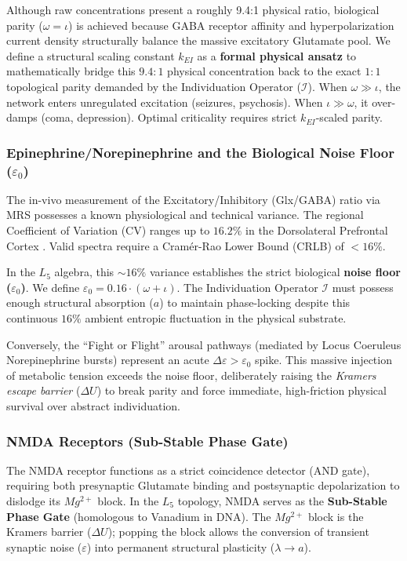 Although raw concentrations present a roughly 9.4:1 physical ratio, biological parity ($\omega = \iota$) is achieved because GABA receptor affinity and hyperpolarization current density structurally balance the massive excitatory Glutamate pool. We define a structural scaling constant $k_{EI}$ as a \textbf{formal physical ansatz} to mathematically bridge this $9.4:1$ physical concentration back to the exact $1:1$ topological parity demanded by the Individuation Operator ($\mathcal{I}$). When $\omega \gg \iota$, the network enters unregulated excitation (seizures, psychosis). When $\iota \gg \omega$, it over-damps (coma, depression). Optimal criticality requires strict $k_{EI}$-scaled parity.

\subsubsection{Epinephrine/Norepinephrine and the Biological Noise Floor (\texorpdfstring{$\varepsilon_0$}{\varepsilon_0})}
The in-vivo measurement of the Excitatory/Inhibitory (Glx/GABA) ratio via MRS possesses a known physiological and technical variance. The regional Coefficient of Variation (CV) ranges up to $16.2\%$ in the Dorsolateral Prefrontal Cortex \cite{mrs_variance}. Valid spectra require a Cramér-Rao Lower Bound (CRLB) of $<16\%$.

In the $L_5$ algebra, this $\sim 16\%$ variance establishes the strict biological \textbf{noise floor ($\varepsilon_0$)}. We define $\varepsilon_0 = 0.16 \cdot (\omega+\iota)$. The Individuation Operator $\mathcal{I}$ must possess enough structural absorption ($a$) to maintain phase-locking despite this continuous $16\%$ ambient entropic fluctuation in the physical substrate. 

Conversely, the ``Fight or Flight'' arousal pathways (mediated by Locus Coeruleus Norepinephrine bursts) represent an acute $\Delta \varepsilon > \varepsilon_0$ spike. This massive injection of metabolic tension exceeds the noise floor, deliberately raising the \emph{Kramers escape barrier} ($\Delta U$) to break parity and force immediate, high-friction physical survival over abstract individuation.

\subsubsection{NMDA Receptors (Sub-Stable Phase Gate)}
The NMDA receptor functions as a strict coincidence detector (AND gate), requiring both presynaptic Glutamate binding and postsynaptic depolarization to dislodge its $Mg^{2+}$ block. In the $L_5$ topology, NMDA serves as the \textbf{Sub-Stable Phase Gate} (homologous to Vanadium in DNA). The $Mg^{2+}$ block is the Kramers barrier ($\Delta U$); popping the block allows the conversion of transient synaptic noise ($\varepsilon$) into permanent structural plasticity ($\lambda \to a$).

